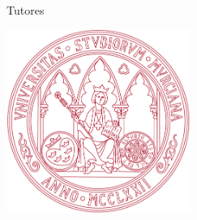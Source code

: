 \begin{titlepage}
    \begin{addmargin}[-1cm]{-3cm}
    \begin{center}
        \large  

        \hfill

        \vfill

        \begingroup
            \color{Maroon}\spacedallcaps{\myTitle} \\ \bigskip
        \endgroup

        \spacedlowsmallcaps{\myName}
		
		 \hfill
		
		Tutores
		
		\spacedlowsmallcaps{\myProf}
		
		\spacedlowsmallcaps{\myOtherProf}


        \vfill

        \includegraphics[width=6cm]{gfx/ESCUDO} \\ \medskip

       \myFaculty \\
       \myUni \\ \bigskip
       

        \vfill                      

    \end{center}  
  \end{addmargin}       
\end{titlepage}   